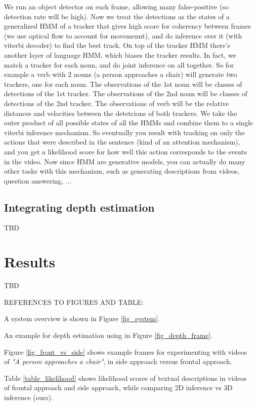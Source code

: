 \documentclass[10pt,twocolumn,letterpaper]{article}
\begin{document}
We run an object detector on each frame, allowing many false-positive (so detection rate will be high). Now we treat the detections as the states of a generalized HMM of a tracker that gives high score for coherency between frames (we use optical flow to account for movemennt), and do inference over it (with viterbi decoder) to find the best track. 
On top of the tracker HMM there's another layer of language HMM, which biases the tracker results. In fact, we match a tracker for each noun, and do joint inference on all together. So for example a verb with 2 nouns (a person approaches a chair) will generate two trackers, one for each noun. The observations of the 1st noun will be classes of detections of the 1st tracker. The observations of the 2nd noun will be classes of detections of the 2nd tracker. The observations of verb will be the relative distances and velocities between the detetcions of both trackers.
We take the outer product of all possible states of all the HMMs and combine them to a single viterbi inference mechanism. So eventually you result with tracking on only the actions that were described in the sentence (kind of an attention mechanism), and you get a likelihood score for how well this action corresponds to the events in the video. Now since HMM are generative models, you can actually do many other tasks with this mechanism, such as generating descriptions from videos, question answering, ...

\subsection{Integrating depth estimation}
TBD

\section{Results}
TBD

REFERENCES TO FIGURES AND TABLE:

A system overview is shown in Figure \ref{fig_system}.

An example for depth estimation using \cite{depthfayao} in Figure \ref{fig_depth_frame}.

Figure \ref{fig_front_vs_side} shows example frames for experimenting with videos of \textit{"A person approaches a chair"}, in side approach versus frontal approach.

Table \ref{table_likelihood} shows likelihood scores of textual descriptions in videos of frontal approach and side approach, while comparing 2D inference \cite{siddharth2014seeing} vs 3D inference (ours).
\end{document}
